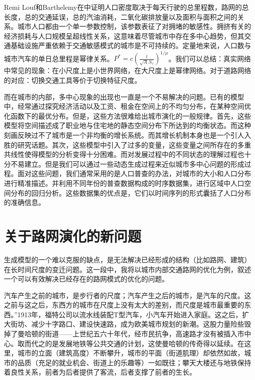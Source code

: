 Remi Louf和Barthelemy在\cite{Louf2014}中证明人口密度取决于每天行驶的总里程数，路网的总长度，总的交通延误，总的汽油消耗，二氧化碳排放量以及面积与面积之间的关系。城市人口都由一个单一参数控制，该参数表征了对拥堵的敏感性。拥挤有关的经济损耗与人口规模呈超线性关系，这意味着尽管城市中存在多中心趋势，但其交通基础设施严重依赖于交通敏感模式的城市是不可持续的。定量地来说，人口数与城市汽车的单日总里程是幂律关系。$P^*=c(\frac{l}{\sqrt{A}N_c})^{1/\mu}$。我们可以总结：真实网络中常见的现象：在小尺度上是小世界网络，在大尺度上是幂律网络。对于道路网络的对应：切换交通工具等价于切换特征尺度。

而在城市的内部，多中心现象的出现也一直是一个不易解决的问题。已有的模型中，经常通过探究经济活动以及工资、租金在空间上的不均匀分布，在某种空间优化函数下的最优分布。但是，这些方法很难给出城市演化的一般规律。首先，这些模型将空间描述成了职业地与住宅地的静态空间分布下所达到的均衡状态。而这种刻画反映过不了城市是一个非均衡的增长系统。而其增长机制本身也是一个引人入胜的研究话题。其次，这些模型中引入了过多的变量，这些变量之间所存在的多重共线性使得模型的分析变得十分困难。而对发展过程中的不同状态的理解过程也十分不易建立。但是我们可以通过一些动态生成过程来近似城市多中心问题的形成过程。面对这些问题，我们通常采用的是人口普查的办法，对城市的大小和人口分布进行精准描述。并利用不同年份的普查数据构成的时序数据集，进行区域中人口空间分布的回归分析。这些数据集的优点是，它们以时间序列的形式囊括了人口分布的准确信息。


\section{关于路网演化的新问题}

生成模型的一个难以克服的缺点，是无法解决已经形成的结构（比如路网、建筑）在长时间尺度的变迁问题。这一段中，我将以城市内部交通路网的优化为例，叙述一个可以有效解决已经存在的路网模式的优化的问题。

汽车产生之前的城市，是步行者的尺度；汽车产生之后的城市，是汽车的尺度。这之前与这之后，东西方的城市在尺度上没有太大的差别，而尺度是城市最重要的东西。”1913年，福特公司以流水线装配T型汽车，小汽车开始进入家庭。这之后，扩大街坊、减少十字路口、建设快速路，成为欧美城市规划的新潮。这股力量险些毁掉了曼哈顿的街道——上世纪五六十年代，经市民抗争，高速路才没有被插入市中心。取而代之的是发展地铁等公共交通的计划，这使曼哈顿的传奇得以延续。在这里，城市的立面（建筑高度）不断攀升，城市的平面（街道肌理）却依然如故，城市的品质（充足的就业机会、街道上的乐趣等）一如既往；攀天大楼还与地铁保持着良性关系，前者为后者提供了客流，后者支撑了前者的生长。

